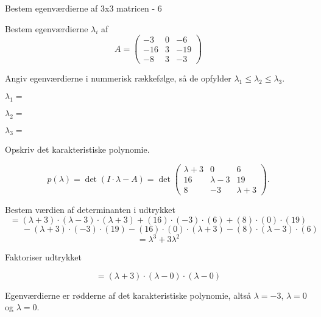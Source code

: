 \documentclass{article}
\begin{document}
\begin{exercise}{Bestem egenværdierne af 3x3 matricen - 6}

Bestem egenværdierne $\lambda_i$ af 
\[
A=\begin{pmatrix}
-3 & 0 & -6 \\
-16 & 3 & -19 \\
-8 & 3 & -3
\end{pmatrix}
\]

Angiv egenværdierne i nummerisk rækkefølge, så de
opfylder $\lambda_1 \le \lambda_2 \le \lambda_3$.

$\lambda_1 = $ 

$\lambda_2 = $ 

$\lambda_3 = $ 

\hint
Opskriv det karakteristiske polynomie.

\hint
\[
p(\lambda)=\det\left(I \cdot \lambda - A \right)=\det\begin{pmatrix}
\lambda + 3 & 0 & 6 \\
16 & \lambda - 3 & 19 \\
8 & -3 & \lambda+3
\end{pmatrix}.
\]

\hint
Bestem værdien af determinanten i udtrykket
\[
=(\lambda+3) \cdot (\lambda-3) \cdot (\lambda+3)+(16) \cdot (-3) \cdot (6)+(8) \cdot (0) \cdot (19)
\]
\[
 \qquad -(\lambda+3) \cdot (-3) \cdot (19)-(16) \cdot (0) \cdot (\lambda+3)-(8) \cdot (\lambda-3) \cdot (6)
\]
\[
=\lambda^3+3\lambda^2
\]

\hint
Faktoriser udtrykket

\hint
\[
=(\lambda+3) \cdot (\lambda-0) \cdot (\lambda-0)
\]

\hint
Egenværdierne er rødderne af det karakteristiske polynomie, 
altså
$\lambda=-3$, $\lambda=0$ og $\lambda=0$.

\end{exercise}
\end{document}
